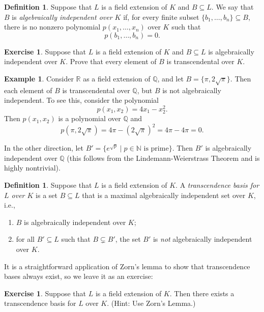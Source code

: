 \documentclass[a4paper]{memoir}
\theoremstyle{definition}
\newtheorem{definition}[theorem]{Definition}
\newtheorem{exercise}[theorem]{Exercise}
\newtheorem{example}[theorem]{Example}
\newcommand{\bb}{\mathbb}
\begin{document}
\begin{definition}
  Suppose that $L$ is a field extension of $K$ and $B \subseteq L$. We say that $B$ is 
  \emph{algebraically independent over $K$} if, for every finite subset 
  $\{b_1, \ldots, b_n\} \subseteq B$, there is no nonzero polynomial $p(x_1, \ldots, x_n)$ over 
  $K$ such that 
  \[
    p(b_1, \ldots, b_n) = 0.
  \]
\end{definition}

\begin{exercise}
  Suppose that $L$ is a field extension of $K$ and $B \subseteq L$ is algebraically 
  independent over $K$. Prove that every element of $B$ is transcendental over $K$.
\end{exercise}

\begin{example}
  Consider $\bb{R}$ as a field extension of $\bb{Q}$, and let $B = \{\pi, 2\sqrt{\pi}\}$. 
  Then each element of $B$ is transcendental over $\bb{Q}$, but $B$ is not 
  algebraically independent. To see this, consider the polynomial
  \[
    p(x_1, x_2) = 4x_1 - x_2^2.
  \]
  Then $p(x_1, x_2)$ is a polynomial over $\bb{Q}$ and 
  \[
    p(\pi, 2\sqrt{\pi}) = 4\pi - (2\sqrt{\pi})^2 = 4\pi - 4\pi = 0.
  \]
  
  In the other direction, let $B' = \{e^{\sqrt{p}} \mid p \in \bb{N} \text{ is prime}\}$. 
  Then $B'$ is algebraically independent over $\bb{Q}$ (this follows from the 
  Lindemann-Weierstrass Theorem and is highly nontrivial).
\end{example}

\begin{definition}
  Suppose that $L$ is a field extension of $K$. A \emph{transcendence basis for 
  $L$ over $K$} is a set $B \subseteq L$ that is a maximal algebraically independent set 
  over $K$, i.e., 
  \begin{enumerate}
    \item $B$ is algebraically independent over $K$;
    \item for all $B' \subseteq L$ such that $B \subsetneq B'$, the set $B'$ is \emph{not} 
    algebraically independent over $K$.
  \end{enumerate}
\end{definition}

It is a straightforward application of Zorn's lemma to show that transcendence bases always 
exist, so we leave it as an exercise:

\begin{exercise}
  Suppose that $L$ is a field extension of $K$. Then there exists a transcendence basis 
  for $L$ over $K$. (Hint: Use Zorn's Lemma.)
\end{exercise}
\end{document}
